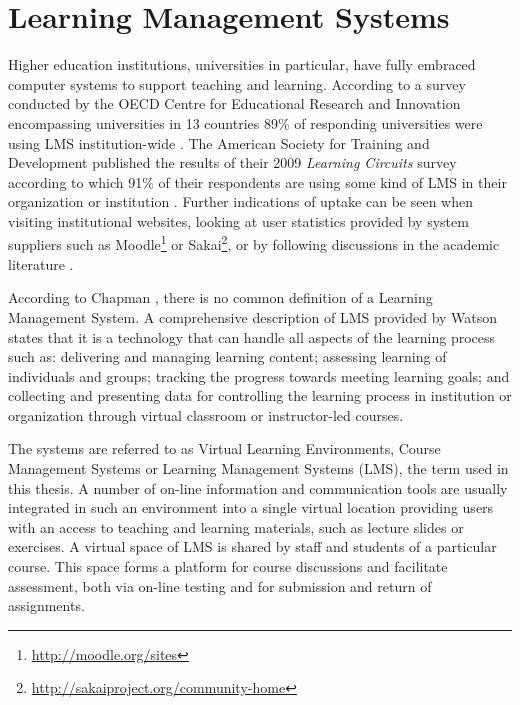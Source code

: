 \section{Learning Management Systems}
Higher education institutions, universities in particular, have fully embraced
computer systems to support teaching and learning. According to a survey
conducted by the OECD Centre for Educational Research and Innovation
encompassing universities in 13 countries 89\% of responding universities were
using LMS institution-wide \citep{OECD2005}. The American Society for Training
and Development published the results of their 2009 \textit{Learning Circuits}
survey according to which 91\% of their respondents are using some kind of LMS
in their organization or institution \citep{Ellis2009}. Further indications of
uptake can be seen when visiting institutional websites, looking at user
statistics provided by system suppliers such as
Moodle\footnote{\url{http://moodle.org/sites}} or
Sakai\footnote{\url{http://sakaiproject.org/community-home}}, or by following
discussions in the academic literature \citep{Browne2006,Collis2004}.

According to Chapman \citeyearpar{Chapman2009}, there is no common definition of
a Learning Management System. A comprehensive description of LMS provided by
Watson \citeyearpar{Watson2007} states that it is a technology that can handle
all aspects of the learning process such as: delivering and managing learning
content; assessing learning of individuals and groups; tracking the progress
towards meeting learning goals; and collecting and presenting data for
controlling the learning process in institution or organization through virtual
classroom or instructor-led courses.

The systems are referred to as Virtual Learning Environments, Course Management
Systems or Learning Management Systems (LMS), the term used in this thesis. A
number of on-line information and communication tools are usually integrated in
such an environment into a single virtual location \citep{Morgan-Klein2007}
providing users with an access to teaching and learning materials, such as
lecture slides or exercises. A virtual space of LMS is shared by staff and
students of a particular course. This space forms a platform for course
discussions and facilitate assessment, both via on-line testing and for
submission and return of assignments.

